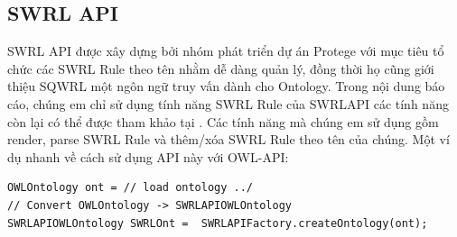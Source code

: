 \subsection{SWRL API}
SWRL API được xây dựng bởi nhóm phát triển dự án Protege \cite{protege} với mục tiêu tổ chức các SWRL Rule theo tên nhằm dễ dàng quản lý, đồng thời họ cũng giới thiệu SQWRL \cite{swrlapi} một ngôn ngữ truy vấn dành cho Ontology. Trong nội dung báo cáo, chúng em chỉ sử dụng tính năng SWRL Rule của SWRLAPI các tính năng còn lại có thể được tham khảo tại \cite{swrlapi}. Các tính năng mà chúng em sử dụng gồm render, parse SWRL Rule và thêm/xóa SWRL Rule theo tên của chúng. Một ví dụ nhanh về cách sử dụng API này với OWL-API:
\begin{verbatim}
OWLOntology ont = // load ontology ../
// Convert OWLOntology -> SWRLAPIOWLOntology
SWRLAPIOWLOntology SWRLOnt =  SWRLAPIFactory.createOntology(ont);
\end{verbatim}
